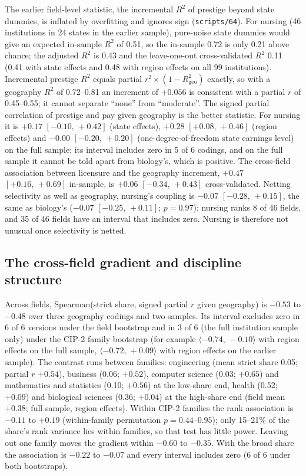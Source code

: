 \documentclass[11pt]{article}
\newcommand{\ci}[2]{$[#1,\allowbreak\,#2]$}
\newcommand{\cic}[2]{$\langle #1,\,#2\rangle$}
\newcommand{\scr}[1]{\texttt{scripts/#1}}
\begin{document}
The earlier field-level statistic, the incremental $R^2$ of prestige beyond state dummies, is inflated by overfitting and
ignores sign (\scr{64}). For nursing (46 institutions in 24 states in the earlier sample), pure-noise state dummies would
give an expected in-sample $R^2$ of 0.51, so the in-sample 0.72 is only 0.21 above chance; the adjusted $R^2$ is 0.43 and the
leave-one-out cross-validated $R^2$ 0.11 (0.41 with state effects and 0.48 with region effects on all 99 institutions).
Incremental prestige $R^2$ equals partial $r^2\times(1-R^2_{\text{geo}})$ exactly, so with a geography $R^2$ of 0.72--0.81 an
increment of $+0.056$ is consistent with a partial $r$ of 0.45--0.55; it cannot separate ``none'' from ``moderate''. The
signed partial correlation of prestige and pay given geography is the better statistic. For nursing it is $+0.17$
\ci{-0.10}{+0.42} (state effects), $+0.28$ \ci{+0.08}{+0.46} (region effects) and $-0.00$ \ci{-0.20}{+0.20} (one-degree-of-freedom state
earnings level) on the full sample; its interval includes zero in 5 of 6 codings, and on the full sample it cannot be told
apart from biology's, which is positive. The cross-field association between licensure and the geography increment,
$+0.47$ \ci{+0.16}{+0.69} in-sample, is $+0.06$ \ci{-0.34}{+0.43} cross-validated. Netting selectivity as well as geography,
nursing's coupling is $-0.07$ \ci{-0.28}{+0.15}, the same as biology's ($-0.07$ \ci{-0.25}{+0.11}; $p=0.97$); nursing ranks 8 of 46
fields, and 35 of 46 fields have an interval that includes zero. Nursing is therefore not unusual once selectivity is netted.

\subsection{The cross-field gradient and discipline structure}\label{sec:gradient}

Across fields, Spearman(strict share, signed partial $r$ given geography) is $-0.53$ to $-0.48$ over three geography codings
and two samples. Its interval excludes zero in 6 of 6 versions under the field bootstrap and in 3 of 6 (the full
institution sample only) under the CIP-2 family bootstrap (for example \cic{-0.74}{-0.10} with region effects on the full
sample, \cic{-0.72}{+0.09} with region effects on the earlier sample). The contrast runs between families: engineering (mean
strict share 0.05; partial $r$ $+0.54$), business (0.06; $+0.52$), computer science (0.03; $+0.65$) and mathematics and
statistics (0.10; $+0.56$) at the low-share end, health (0.52; $+0.09$) and biological sciences (0.36; $+0.04$) at the
high-share end (field mean $+0.38$; full sample, region effects). Within CIP-2 families the rank association is $-0.11$ to
$+0.19$ (within-family permutation $p=0.44$--$0.95$); only 15--21\% of the share's rank variance lies within families, so that
test has little power. Leaving out one family moves the gradient within $-0.60$ to $-0.35$. With the broad share the
association is $-0.22$ to $-0.07$ and every interval includes zero (6 of 6 under both bootstraps).
\end{document}
